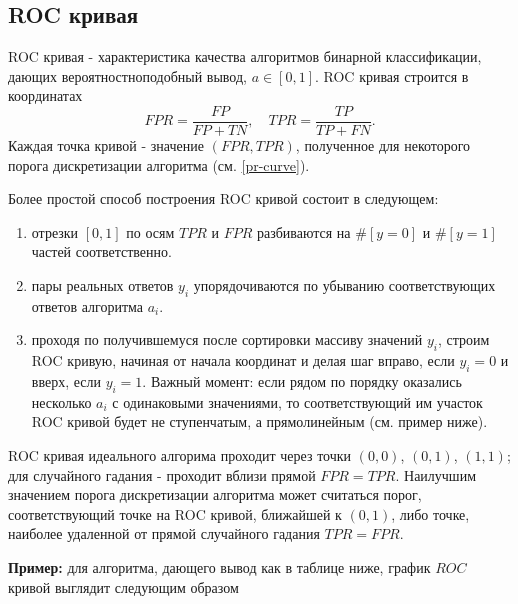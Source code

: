 \subsection{ROC кривая}\label{roc-curve}

ROC кривая - характеристика качества алгоритмов бинарной классификации, дающих вероятностноподобный вывод, $a\in[0, 1]$. 
ROC кривая строится в координатах 
$$
FPR = \frac{FP}{FP + TN}, \quad TPR = \frac{TP}{TP + FN}.
$$
Каждая точка кривой - значение $(FPR, TPR)$, полученное для некоторого порога дискретизации алгоритма (см. \ref{pr-curve}). 

Более простой способ построения ROC кривой состоит в следующем:
\begin{enumerate}
    \item отрезки $[0, 1]$ по осям $TPR$ и $FPR$ разбиваются на $\#[y=0]$ и $\#[y=1]$ частей соответственно.
    \item пары реальных ответов $y_i$ упорядочиваются по убыванию соответствующих ответов алгоритма $a_i$.
    \item проходя по получившемуся после сортировки массиву значений $y_i$, строим ROC кривую, начиная от начала координат и делая шаг вправо, если $y_i=0$ и вверх, если $y_i=1$. Важный момент: если рядом по порядку оказались несколько $a_i$ с одинаковыми значениями, то соответствующий им участок ROC кривой будет не ступенчатым, а прямолинейным (см. пример ниже).
\end{enumerate}

ROC кривая идеального алгорима проходит через точки $(0,0)$, $(0,1)$, $(1,1)$; для случайного гадания - проходит вблизи прямой $FPR = TPR$. Наилучшим значением порога дискретизации алгоритма может считаться порог, соответствующий точке на ROC кривой, ближайшей к $(0, 1)$, либо точке, наиболее удаленной от прямой случайного гадания $TPR = FPR$. 

\textbf{Пример:} для алгоритма, дающего вывод как в таблице ниже, график $ROC$ кривой выглядит следующим образом


